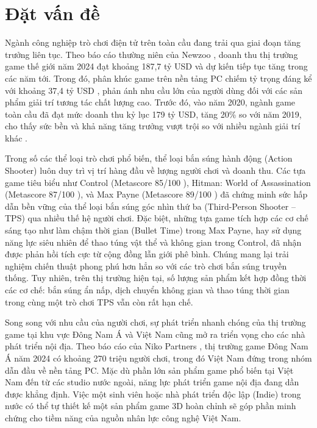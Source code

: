 \documentclass[../DoAn.tex]{subfiles}
\begin{document}
\section{Đặt vấn đề}
\label{section:1.1}

Ngành công nghiệp trò chơi điện tử trên toàn cầu đang trải qua giai đoạn tăng trưởng liên tục. Theo báo cáo thường niên của Newzoo \cite{Newzoo2024}, doanh thu thị trường game thế giới năm 2024 đạt khoảng 187,7 tỷ USD và dự kiến tiếp tục tăng trong các năm tới. Trong đó, phân khúc game trên nền tảng PC chiếm tỷ trọng đáng kể với khoảng 37,4 tỷ USD \cite{Newzoo2024}, phản ánh nhu cầu lớn của người dùng đối với các sản phẩm giải trí tương tác chất lượng cao. Trước đó, vào năm 2020, ngành game toàn cầu đã đạt mức doanh thu kỷ lục 179 tỷ USD, tăng 20\% so với năm 2019, cho thấy sức bền và khả năng tăng trưởng vượt trội so với nhiều ngành giải trí khác \cite{Witkowski2020}.

Trong số các thể loại trò chơi phổ biến, thể loại bắn súng hành động (Action Shooter) luôn duy trì vị trí hàng đầu về lượng người chơi và doanh thu. Các tựa game tiêu biểu như Control (Metascore 85/100 \cite{MetacriticControl}), Hitman: World of Assassination (Metascore 87/100 \cite{MetacriticHitman3}), và Max Payne (Metascore 89/100 \cite{MetacriticMaxPayne}) đã chứng minh sức hấp dẫn bền vững của thể loại bắn súng góc nhìn thứ ba (Third-Person Shooter -- TPS) qua nhiều thế hệ người chơi. Đặc biệt, những tựa game tích hợp các cơ chế sáng tạo như làm chậm thời gian (Bullet Time) trong Max Payne, hay sử dụng năng lực siêu nhiên để thao túng vật thể và không gian trong Control, đã nhận được phản hồi tích cực từ cộng đồng lẫn giới phê bình. Chúng mang lại trải nghiệm chiến thuật phong phú hơn hẳn so với các trò chơi bắn súng truyền thống. Tuy nhiên, trên thị trường hiện tại, số lượng sản phẩm kết hợp đồng thời các cơ chế: bắn súng ẩn nấp, dịch chuyển không gian và thao túng thời gian trong cùng một trò chơi TPS vẫn còn rất hạn chế.

Song song với nhu cầu của người chơi, sự phát triển nhanh chóng của thị trường game tại khu vực Đông Nam Á và Việt Nam cũng mở ra triển vọng cho các nhà phát triển nội địa. Theo báo cáo của Niko Partners \cite{NikoPartners2024}, thị trường game Đông Nam Á năm 2024 có khoảng 270 triệu người chơi, trong đó Việt Nam đứng trong nhóm dẫn đầu về nền tảng PC. Mặc dù phần lớn sản phẩm game phổ biến tại Việt Nam đến từ các studio nước ngoài, năng lực phát triển game nội địa đang dần được khẳng định. Việc một sinh viên hoặc nhà phát triển độc lập (Indie) trong nước có thể tự thiết kế một sản phẩm game 3D hoàn chỉnh sẽ góp phần minh chứng cho tiềm năng của nguồn nhân lực công nghệ Việt Nam.
\end{document}
